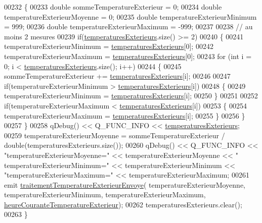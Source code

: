 \begin{DoxyCode}
00232 \{
00233     \textcolor{keywordtype}{double} sommeTemperatureExterieur = 0;
00234     \textcolor{keywordtype}{double} temperatureExterieurMoyenne = 0;
00235     \textcolor{keywordtype}{double} temperatureExterieurMinimum = 999;
00236     \textcolor{keywordtype}{double} temperatureExterieurMaximum = -999;
00237 
00238     \textcolor{comment}{// au moins 2 mesures}
00239     \textcolor{keywordflow}{if}(\hyperlink{class_infos_temperature_a32b2a36e737ab4bf61fc8274990c2943}{temperaturesExterieurs}.size() >= 2)
00240     \{
00241         temperatureExterieurMinimum = \hyperlink{class_infos_temperature_a32b2a36e737ab4bf61fc8274990c2943}{temperaturesExterieurs}[0];
00242         temperatureExterieurMaximum = \hyperlink{class_infos_temperature_a32b2a36e737ab4bf61fc8274990c2943}{temperaturesExterieurs}[0];
00243         \textcolor{keywordflow}{for} (\textcolor{keywordtype}{int} i = 0; i < \hyperlink{class_infos_temperature_a32b2a36e737ab4bf61fc8274990c2943}{temperaturesExterieurs}.size(); i++)
00244         \{
00245             sommeTemperatureExterieur += \hyperlink{class_infos_temperature_a32b2a36e737ab4bf61fc8274990c2943}{temperaturesExterieurs}[i];
00246 
00247             \textcolor{keywordflow}{if}(temperatureExterieurMinimum > \hyperlink{class_infos_temperature_a32b2a36e737ab4bf61fc8274990c2943}{temperaturesExterieurs}[i])
00248             \{
00249                 temperatureExterieurMinimum = \hyperlink{class_infos_temperature_a32b2a36e737ab4bf61fc8274990c2943}{temperaturesExterieurs}[i];
00250             \}
00251 
00252             \textcolor{keywordflow}{if}(temperatureExterieurMaximum < \hyperlink{class_infos_temperature_a32b2a36e737ab4bf61fc8274990c2943}{temperaturesExterieurs}[i])
00253             \{
00254                 temperatureExterieurMaximum = \hyperlink{class_infos_temperature_a32b2a36e737ab4bf61fc8274990c2943}{temperaturesExterieurs}[i];
00255             \}
00256         \}
00257     \}
00258     qDebug() << Q\_FUNC\_INFO << \hyperlink{class_infos_temperature_a32b2a36e737ab4bf61fc8274990c2943}{temperaturesExterieurs};
00259     temperatureExterieurMoyenne = sommeTemperatureExterieur / double(temperaturesExterieurs.size());
00260     qDebug() << Q\_FUNC\_INFO << \textcolor{stringliteral}{"temperatureExterieurMoyenne="} << temperatureExterieurMoyenne << \textcolor{stringliteral}{"
      temperatureExterieurMinimum="} << temperatureExterieurMinimum << \textcolor{stringliteral}{"temperatureExterieurMaximum="} << 
      temperatureExterieurMaximum;
00261     emit \hyperlink{class_infos_temperature_aaebee9d6151257fa1f182665d0fecf2c}{traitementTemperatureExterieurEnvoye}(
      temperatureExterieurMoyenne, temperatureExterieurMinimum, temperatureExterieurMaximum, 
      \hyperlink{class_infos_temperature_a44edcf244175896e28798f252900f774}{heureCouranteTemperatureExterieur});
00262     temperaturesExterieurs.clear();
00263 \}
\end{DoxyCode}
